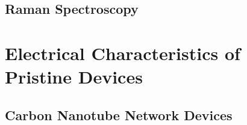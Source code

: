 \documentclass[
  a4paper,
]{scrbook}
\begin{document}
\hypertarget{sec-pristine-raman}{%
\subsection{Raman Spectroscopy}\label{sec-pristine-raman}}

\hypertarget{sec-pristine-electrical-characterisation}{%
\section{Electrical Characteristics of Pristine
Devices}\label{sec-pristine-electrical-characterisation}}

\hypertarget{carbon-nanotube-network-devices}{%
\subsection{Carbon Nanotube Network
Devices}\label{carbon-nanotube-network-devices}}
\end{document}
